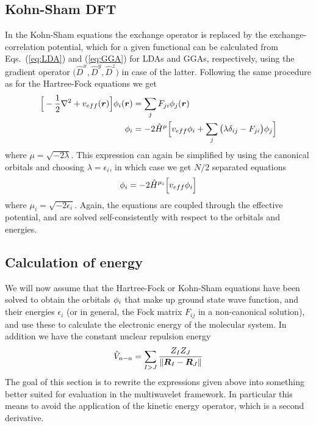 \subsection{Kohn-Sham DFT}
In the Kohn-Sham equations the exchange operator is replaced by the exchange-correlation potential,
which for a given functional can be calculated from Eqs.~(\ref{eq:LDA}) and (\ref{eq:GGA}) for LDAs 
and GGAs, respectively, using the gradient operator $\big(\hat{D}^x, \hat{D}^y, \hat{D}^z\big)$ in
case of the latter. Following the same procedure as for the Hartree-Fock equations we get
\begin{align}
    \Big[-\frac{1}{2}\nabla^2+v_{eff}(\boldsymbol r)\Big]\phi_i(\boldsymbol r) 
	    &= \sum_j F_{ji} \phi_j(\boldsymbol r)\\
    \phi_i &= -2\hat{H}^\mu\Big[v_{eff} \phi_i + 
	\sum_j \big(\lambda\delta_{ij} - F_{ji}\big) \phi_j\Big]
\end{align}
where $\mu = \sqrt{-2\lambda}$. This expression can again be simplified by using the canonical orbitals
and choosing $\lambda = \epsilon_i$, in which case we get $N/2$ separated equations
\begin{equation}
    \phi_i = -2 \hat{H}^{\mu_i}\Big[v_{eff}\phi_i\Big]
\end{equation}
where $\mu_i = \sqrt{-2\epsilon_i}$. Again, the equations are coupled through the effective potential,
and are solved self-consistently with respect to the orbitals and energies.

\subsection{Calculation of energy}
We will now assume that the Hartree-Fock or Kohn-Sham equations have been solved to obtain
the orbitals $\phi_i$ that make up ground state wave function, and their energies 
$\epsilon_i$ (or in general, the Fock matrix $F_{ij}$ in a non-canonical solution), and use
these to calculate the electronic energy of the molecular system. In addition we have the
constant nuclear repulsion energy
\begin{equation}
    \hat{V}_{n-n} = \sum_{I>J} \frac{Z_IZ_J}{\|\boldsymbol R_I-\boldsymbol R_J\|}
\end{equation}
The goal of this section is to rewrite the expressions given above into something better 
suited for evaluation in the multiwavelet framework. In particular this means to avoid
the application of the kinetic energy operator, which is a second derivative.

